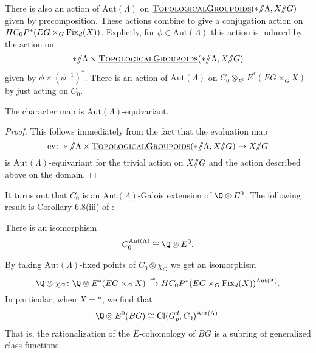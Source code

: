 There is also an action of \(\mathrm{Aut}(\Lambda)\) on \(\operatorname{\underline{\smash{\normalfont\textsc{TopologicalGroupoids}}}}(* /\!\!/ \Lambda, X /\!\!/ G)\) given by precomposition. These actions combine to give a conjugation action on \(HC_{0}P^{*}(EG \times_G \operatorname{Fix}_d(X))\). Explictly, for \(\phi \in \mathrm{Aut}(\Lambda)\) this action is induced by the action on 
\[
* /\!\!/ \Lambda \times \operatorname{\underline{\smash{\normalfont\textsc{TopologicalGroupoids}}}}(* /\!\!/ \Lambda, X /\!\!/ G)
\]
given by \(\phi \times (\phi^{-1})^*\). There is an action of \(\mathrm{Aut}(\Lambda)\) on \(C_0 \otimes_{E^0} E^*(EG \times_G X)\) by just acting on \(C_0\).



\begin{proposition}
The character map is \(\mathrm{Aut}(\Lambda)\)-equivariant.
\end{proposition}
\begin{proof}
This follows immediately from the fact that the evaluation map
\[
\mathrm{ev} \colon * \mmod \Lambda \times \InternalHom{TopologicalGroupoids}(* \mmod \Lambda, X \mmod G) \to X \mmod G
\]
is \(\mathrm{Aut}(\Lambda)\)-equivariant for the trivial action on \(X /\!\!/ G\) and the action described above on the domain.
\end{proof}

It turns out that \(C_0\) is an \(\mathrm{Aut}(\Lambda)\)-Galois extension of \(\Q \otimes E^0\). The following result is Corollary 6.8(iii) of \cite{HKR}:
\begin{proposition}
There is an isomorphism
\[
C_{0}^{\mathrm{Aut}(\Lambda)} \cong \Q \otimes E^0.
\]
\end{proposition}

By taking \(\mathrm{Aut}(\Lambda)\)-fixed points of \(C_0 \otimes \chi_G\) we get an isomorphism
\[
\Q \otimes \chi_G \colon \Q \otimes E^*(EG \times_G X) \xrightarrow{\cong} HC_{0}P^{*}(EG \times_G \Fix_d(X))^{\mathrm{Aut}(\Lambda)}.
\]
In particular, when \(X = *\), we find that
\[
\Q \otimes E^0(BG) \cong \mathrm{Cl}(G_{p}^{d}, C_0)^{\mathrm{Aut}(\Lambda)}.
\]
That is, the rationalization of the \(E\)-cohomology of \(BG\) is a subring of generalized class functions.
